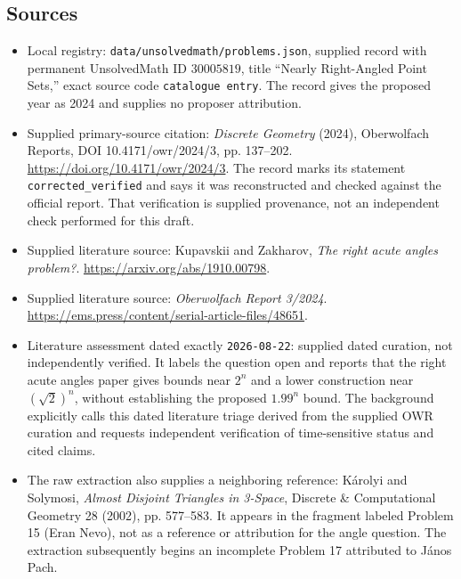 \documentclass[11pt]{article}
\begin{document}
\subsection{Sources}
\begin{itemize}
\item Local registry: \texttt{data/unsolvedmath/problems.json}, supplied record with permanent UnsolvedMath ID \(30005819\), title ``Nearly Right-Angled Point Sets,'' exact source code \texttt{catalogue entry}. The record gives the proposed year as 2024 and supplies no proposer attribution.
\item Supplied primary-source citation: \emph{Discrete Geometry} (2024), Oberwolfach Reports, DOI 10.4171/owr/2024/3, pp. 137--202. \url{https://doi.org/10.4171/owr/2024/3}. The record marks its statement \texttt{corrected\_verified} and says it was reconstructed and checked against the official report. That verification is supplied provenance, not an independent check performed for this draft.
\item Supplied literature source: Kupavskii and Zakharov, \emph{The right acute angles problem?}. \url{https://arxiv.org/abs/1910.00798}.
\item Supplied literature source: \emph{Oberwolfach Report 3/2024}. \url{https://ems.press/content/serial-article-files/48651}.
\item Literature assessment dated exactly \texttt{2026-08-22}: supplied dated curation, not independently verified. It labels the question open and reports that the right acute angles paper gives bounds near \(2^n\) and a lower construction near \((\sqrt{2})^n\), without establishing the proposed \(1.99^n\) bound. The background explicitly calls this dated literature triage derived from the supplied OWR curation and requests independent verification of time-sensitive status and cited claims.
\item The raw extraction also supplies a neighboring reference: K\'arolyi and Solymosi, \emph{Almost Disjoint Triangles in 3-Space}, Discrete \& Computational Geometry 28 (2002), pp. 577--583. It appears in the fragment labeled Problem 15 (Eran Nevo), not as a reference or attribution for the angle question. The extraction subsequently begins an incomplete Problem 17 attributed to J\'anos Pach.
\end{itemize}
\end{document}
